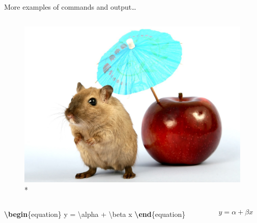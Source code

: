 \documentclass[,aspectratio=43]{beamer}
\newenvironment{Shaded}{\begin{snugshade}}{\end{snugshade}}
\newcommand{\ExtensionTok}[1]{#1}
\newcommand{\KeywordTok}[1]{\textcolor[rgb]{0.00,0.44,0.13}{\textbf{#1}}}
\newcommand{\NormalTok}[1]{#1}
\newcommand{\SpecialCharTok}[1]{\textcolor[rgb]{0.25,0.44,0.63}{#1}}
\newcommand{\SpecialStringTok}[1]{\textcolor[rgb]{0.73,0.40,0.53}{#1}}
\begin{document}
\begin{frame}[fragile]{More examples of commands and output\ldots{}}
\begin{columns}[T]
\begin{column}{0.48\textwidth}
\begin{figure}
\includegraphics{gerbil}*
\end{figure}
\end{column}
\end{columns}

\begin{columns}[T]
\begin{column}{0.48\textwidth}
\begin{Shaded}
\begin{Highlighting}[]
\KeywordTok{\textbackslash{}begin}\NormalTok{\{}\ExtensionTok{equation}\NormalTok{\}}
\SpecialStringTok{y = }\SpecialCharTok{\textbackslash{}alpha}\SpecialStringTok{ + }\SpecialCharTok{\textbackslash{}beta}\SpecialStringTok{ x}
\KeywordTok{\textbackslash{}end}\NormalTok{\{}\ExtensionTok{equation}\NormalTok{\}}
\end{Highlighting}
\end{Shaded}
\end{column}

\begin{column}{0.48\textwidth}
\vspace{2.5em}

\begin{equation}
y = \alpha + \beta x
\end{equation}
\end{column}
\end{columns}

\end{frame}
\end{document}
